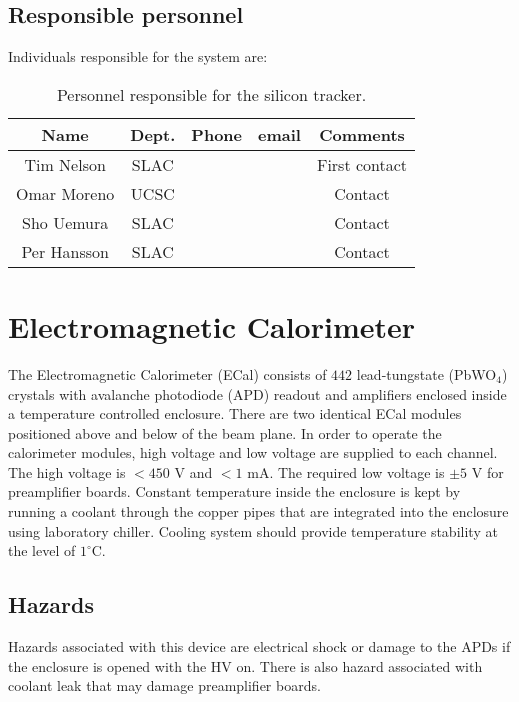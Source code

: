 \documentclass[11pt]{report}
\begin{document}
\subsection{Responsible personnel}
\indent

Individuals responsible for the system are:

 \begin{table}[!htb]
 \centering
 \begin{tabular}{|c|c|c|c|c|}
\hline
 Name&Dept.&Phone&email&Comments \\ \hline
Tim Nelson& SLAC&&& First contact \\ \hline
Omar Moreno & UCSC & && Contact \\ \hline
Sho Uemura&SLAC& && Contact \\ \hline
Per Hansson&SLAC& && Contact \\ \hline
 \end{tabular}
\caption{Personnel responsible for the silicon tracker.} 
\label{tb:svt}
\end{table}



\section{Electromagnetic Calorimeter}
\indent

The Electromagnetic Calorimeter (ECal) consists of $442$ lead-tungstate (PbWO$_4$) crystals with avalanche photodiode (APD) 
readout and amplifiers enclosed inside a temperature controlled enclosure. There are two identical ECal modules positioned above and below of the beam plane. In order to operate the calorimeter modules,  high voltage and low voltage are supplied to each channel. The high voltage is $<450$ V and $<1$ mA. The required low voltage is $\pm 5$ V for preamplifier boards. Constant temperature inside the enclosure is kept by running a coolant through the copper pipes that are integrated into the enclosure using laboratory chiller. Cooling system should provide temperature stability at the level of $1^\circ$C.

\subsection{Hazards} 
\indent

Hazards associated with this device are electrical shock or damage to the APDs if the enclosure is opened with the  HV on. There is also hazard associated with coolant leak that may damage preamplifier boards.
\end{document}
